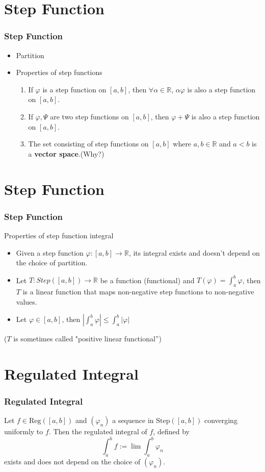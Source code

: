 \documentclass[12pt, t]{beamer}
\begin{document}
\section{Step Function}
\begin{frame}
    \frametitle{Step Function}
\begin{itemize}
    \item Partition
    \item Properties of step functions
        \begin{enumerate}
            \item If $\varphi$ is a step function on $[a,b]$, then $\forall\alpha\in\mathbb{R}$, $\alpha\varphi$ is also a step function on $[a,b]$.
            \item If $\varphi,\Psi$ are two step functions on $[a,b]$, then $\varphi+\Psi$ is also a step function on $[a,b]$.
            \item The set consisting of step functions on $[a,b]$ where $a,b\in\mathbb{R}$ and $a<b$ is a \textbf{vector space}.(Why?)
        \end{enumerate}
\end{itemize}


\end{frame}

\section{Step Function}
\begin{frame}
    \frametitle{Step Function}
Properties of step function integral
\begin{itemize}
    \item Given a step function $\varphi:[a,b]\rightarrow\mathbb{R}$, its integral exists and doesn't depend on the choice of partition.
    \item Let $T:Step([a,b])\rightarrow\mathbb{R}$ be a function (functional) and $T(\varphi)=\int_{a}^{b}\varphi$, then $T$ is a linear function that maps non-negative step functions to non-negative values.
    \item Let $\varphi\in[a,b]$, then $|\int^{b}_{a}\varphi|\leq\int^{b}_{a}|\varphi|$
\end{itemize}
\mbox{}
\vfill
\footnotesize($T$ is sometimes called "positive linear functional'')
\end{frame}

\section{Regulated Integral}
\begin{frame}
    \frametitle{Regulated Integral}
\hspace{2em} Let $f\in\text{Reg}([a,b])$ and $(\varphi_n)$ a sequence in $\text{Step}([a,b])$ converging uniformly to $f$. Then the regulated integral of $f$, defined by 
\begin{equation*}
    \int_a^bf:=\lim\int_a^b\varphi_n
\end{equation*}
exists and does not depend on the choice of $(\varphi_n)$.
\end{frame}
\end{document}
